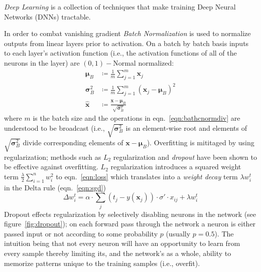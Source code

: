 \textit{Deep Learning} is a collection of techniques that make training Deep Neural Networks (DNNs) tractable. 
%


In order to combat vanishing gradient \textit{Batch Normalization}\cite{ioffe2015batch} is used to normalize outputs from linear layers prior to activation.
%
On a batch by batch basis inputs to each layer's activation function (i.e., the activation functions of all of the neurons in the layer) are \((0,1)-\)Normal normalized:
\begin{align}
    \bm{\mu} _{B} &\coloneqq {\frac {1}{m}}\sum _{j=1}^{m}\bm{x}_{j} \\
    \bm{\sigma} _{B}^{2} &\coloneqq{\frac {1}{m}}\sum _{j=1}^{m}(\bm{x}_{j}-\bm{\mu}_{B})^{2}\\
    {\hat {\bm{x}}} &\coloneqq {\frac {\bm{x}-\bm{\mu}_{B}}{\sqrt {\bm{\sigma}_{B}^{2}}}} \label{eqn:bathcnormdiv}
\end{align}
where \(m\) is the batch size and the operations in eqn.~\eqref{eqn:bathcnormdiv} are understood to be broadcast (i.e., \(\sqrt {\bm{\sigma} _{B}^{2}}\) is an element-wise root and elements of \(\sqrt {\bm{\sigma} _{B}^{2}}\) divide corresponding elements of \(\bm{x}-\bm{\mu}_{B}\)).
%
Overfitting is mititaged by using regularization; methods such as \(L_2\) regularization and \textit{dropout} have been shown to be effective against overfitting\cite{bengio2013}.
%
\(L_2\) regularization introduces a squared weight term \(\frac{\lambda}{2}\sum_{i=1}^n w_i^2\) to eqn.~\eqref{eqn:loss} which translates into a \textit{weight decay} term \(\lambda w_i^t\) in the Delta rule (eqn.~\eqref{eqn:sgd})
\begin{equation}
    \Delta w_i^t = \alpha \cdot \sum_j (t_j-y(\mathbf{x}_j))\cdot \sigma'\cdot x_{ij} + \lambda w_i^t
    \label{eqn:weightdecaydelta}
\end{equation}
Dropout effects regularization by selectively disabling neurons in the network (see figure~\ref{fig:dropout}); on each forward pass through the network a neuron is either passed input or not according to some probability \(p\) (usually \(p = 0.5\)).
%
The intuition being that not every neuron will have an opportunity to learn from every sample thereby limiting its, and the network's as a whole, ability to memorize patterns unique to the training samples (i.e., overfit).


